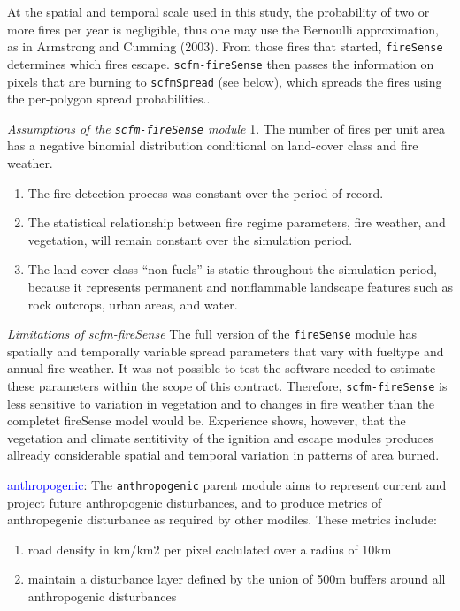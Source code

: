 \documentclass[]{article}
\providecommand{\tightlist}{%
  \setlength{\itemsep}{0pt}\setlength{\parskip}{0pt}}
\begin{document}
At the spatial and temporal scale used in this study, the probability of
two or more fires per year is negligible, thus one may use the Bernoulli
approximation, as in Armstrong and Cumming (2003). From those fires that
started, \texttt{fireSense} determines which fires escape.
\texttt{scfm-fireSense} then passes the information on pixels that are
burning to \texttt{scfmSpread} (see below), which spreads the fires
using the per-polygon spread probabilities..

\emph{Assumptions of the \texttt{scfm-fireSense} module} 1. The number
of fires per unit area has a negative binomial distribution conditional
on land-cover class and fire weather.

\begin{enumerate}
\def\labelenumi{\arabic{enumi}.}
\setcounter{enumi}{1}
\item
  The fire detection process was constant over the period of record.
\item
  The statistical relationship between fire regime parameters, fire
  weather, and vegetation, will remain constant over the simulation
  period.
\item
  The land cover class ``non-fuels'' is static throughout the simulation
  period, because it represents permanent and nonflammable landscape
  features such as rock outcrops, urban areas, and water.
\end{enumerate}

\emph{Limitations of scfm-fireSense} The full version of the
\texttt{fireSense} module has spatially and temporally variable spread
parameters that vary with fueltype and annual fire weather. It was not
possible to test the software needed to estimate these parameters within
the scope of this contract. Therefore, \texttt{scfm-fireSense} is less
sensitive to variation in vegetation and to changes in fire weather than
the completet fireSense model would be. Experience shows, however, that
the vegetation and climate sentitivity of the ignition and escape
modules produces allready considerable spatial and temporal variation in
patterns of area burned.

\textcolor{blue}{anthropogenic}: The \texttt{anthropogenic} parent
module aims to represent current and project future anthropogenic
disturbances, and to produce metrics of anthropegenic disturbance as
required by other modiles. These metrics include:

\begin{enumerate}
\def\labelenumi{\arabic{enumi}.}
\tightlist
\item
  road density in km/km2 per pixel caclulated over a radius of 10km
\item
  maintain a disturbance layer defined by the union of 500m buffers
  around all anthropogenic disturbances
\end{enumerate}
\end{document}
